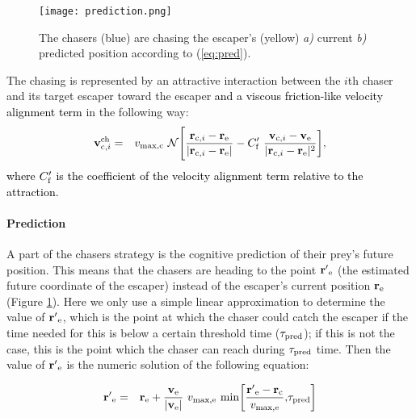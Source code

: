 \documentclass[12pt,a4paper,final]{iopart}
\newcommand{\revision}{\textcolor{black}}
\newcommand{\revisiontwo}{\textcolor{black}}
\begin{document}
\begin{figure}
\begin{center}
\texttt{[image: prediction.png]}
\caption{The chasers (blue) are chasing the escaper's (yellow) {\it a)} current {\it b)} predicted position according to (\ref{eq:pred}).}
\label{fig:prediction}
\end{center}
\end{figure} 
The chasing is represented by an attractive interaction between the $i$th chaser and its target escaper toward the escaper \revision{and a  viscous friction-like velocity alignment term} in the following way:
\begin{eqnarray}
{\bf v}_{{\rm c}, i}^{\rm ch} &=& v_{\rm max,c} \  \mathcal{N}\Bigg[ \frac{{\bf r}_{{\rm c},i} - {\bf r}_{\rm e}}{|{\bf r}_{{\rm c},i} - {\bf r}_{\rm e}|} - C'_{\rm f} \  \frac{{\bf v}_{{\rm c}, i} - {\bf v}_{\rm e} }{|{\bf r}_{{\rm c},i} - {\bf r}_{\rm e}|^2} \bigg],
\label{eq:chasing}
\end{eqnarray}
\revision{where $C'_{\revisiontwo{\rm f}}$ is the coefficient of the  velocity alignment term relative to the attraction.}%
\paragraph{Prediction} 
A part of the chasers strategy is the cognitive prediction of their prey's future position. This means that the chasers are heading to the point ${\bf r'}_{\rm e}$ (the estimated future coordinate of the escaper) instead of the escaper's current position ${\bf r}_{\rm e}$ (Figure \ref{fig:prediction}). Here we only use a simple linear approximation to determine the value of ${\bf r'}_{\rm e}$, which is the point at which the chaser could catch the escaper if the time needed for this is below a certain threshold time ($\tau_{\rm pred}$); if this is not the case, this is the point which the chaser can reach during $\tau_{\rm pred}$ time. Then the value of ${\bf r'}_{\rm e}$ is the numeric solution of the following equation:

\begin{eqnarray}
{\bf r'}_{\rm e} &=& {\bf r}_{\rm e} + \revision{   \frac{{\bf v}_{\rm e}}{|{\bf v}_{\rm e}|}} \  {v}_{\rm max, e} \  {\rm min} \bigg[\frac{{\bf r'}_{\rm e} - {\bf r}_{\rm c}}{\revisiontwo{{v}_{\rm max, e}}}\revision{,} \tau_{\rm pred} \bigg]
\label{eq:pred}
\end{eqnarray}
\end{document}

